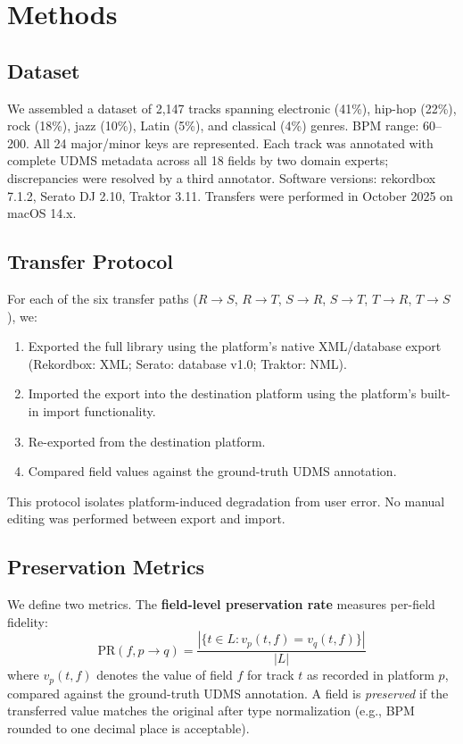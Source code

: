 \section{Methods}

\subsection{Dataset}

We assembled a dataset of 2,147 tracks spanning electronic (41\%), hip-hop (22\%), rock (18\%), jazz (10\%), Latin (5\%), and classical (4\%) genres. BPM range: 60--200. All 24 major/minor keys are represented. Each track was annotated with complete UDMS metadata across all 18 fields by two domain experts; discrepancies were resolved by a third annotator. Software versions: rekordbox 7.1.2, Serato DJ 2.10, Traktor 3.11. Transfers were performed in October 2025 on macOS 14.x.

\subsection{Transfer Protocol}

For each of the six transfer paths ($R \to S$, $R \to T$, $S \to R$, $S \to T$, $T \to R$, $T \to S$), we:
\begin{enumerate}
  \item Exported the full library using the platform's native XML/database export (Rekordbox: XML; Serato: database v1.0; Traktor: NML).
  \item Imported the export into the destination platform using the platform's built-in import functionality.
  \item Re-exported from the destination platform.
  \item Compared field values against the ground-truth UDMS annotation.
\end{enumerate}

This protocol isolates platform-induced degradation from user error. No manual editing was performed between export and import.

\subsection{Preservation Metrics}

We define two metrics. The \textbf{field-level preservation rate} measures per-field fidelity:
\begin{equation}
  \text{PR}(f, p \to q) = \frac{| \{ t \in L : v_p(t, f) = v_q(t, f) \} |}{|L|}
\end{equation}
where $v_p(t, f)$ denotes the value of field $f$ for track $t$ as recorded in platform $p$, compared against the ground-truth UDMS annotation. A field is \emph{preserved} if the transferred value matches the original after type normalization (e.g., BPM rounded to one decimal place is acceptable).

